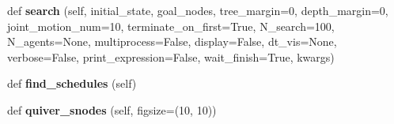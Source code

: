 \begin{DoxyCompactItemize}
\mbox{\label{classrnb-planning_1_1src_1_1pkg_1_1planning_1_1task_1_1handle__a__star_1_1_handle_astar_ac92c8f93213b39d824d5031accaf2641}} 
def {\bfseries search} (self, initial\+\_\+state, goal\+\_\+nodes, tree\+\_\+margin=0, depth\+\_\+margin=0, joint\+\_\+motion\+\_\+num=10, terminate\+\_\+on\+\_\+first=True, N\+\_\+search=100, N\+\_\+agents=None, multiprocess=False, display=False, dt\+\_\+vis=None, verbose=False, print\+\_\+expression=False, wait\+\_\+finish=True, kwargs)
\item 
\mbox{\label{classrnb-planning_1_1src_1_1pkg_1_1planning_1_1task_1_1handle__a__star_1_1_handle_astar_aa9281edca2315ecc1a1542f358ab138a}} 
def {\bfseries find\+\_\+schedules} (self)
\item 
\mbox{\label{classrnb-planning_1_1src_1_1pkg_1_1planning_1_1task_1_1handle__a__star_1_1_handle_astar_a0c827ec97c9fbf147537ae0f985d6d7f}} 
def {\bfseries quiver\+\_\+snodes} (self, figsize=(10, 10))
\end{DoxyCompactItemize}
